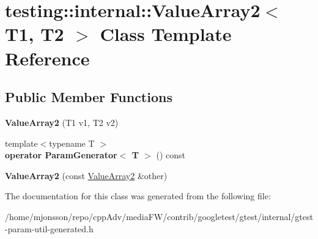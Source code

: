 \hypertarget{classtesting_1_1internal_1_1ValueArray2}{}\section{testing\+:\+:internal\+:\+:Value\+Array2$<$ T1, T2 $>$ Class Template Reference}
\label{classtesting_1_1internal_1_1ValueArray2}
\subsection*{Public Member Functions}
\begin{DoxyCompactItemize}
\item 
\mbox{\label{classtesting_1_1internal_1_1ValueArray2_af641714b9a06929e4dcabe8854d0da1c}} 
{\bfseries Value\+Array2} (T1 v1, T2 v2)
\item 
\mbox{\label{classtesting_1_1internal_1_1ValueArray2_aa81899f10bfd345c17aae540acc296a9}} 
{\footnotesize template$<$typename T $>$ }\\{\bfseries operator Param\+Generator$<$ T $>$} () const
\item 
\mbox{\label{classtesting_1_1internal_1_1ValueArray2_ac0da580bf4f38494da741c7140a7927d}} 
{\bfseries Value\+Array2} (const \hyperlink{classtesting_1_1internal_1_1ValueArray2}{Value\+Array2} \&other)
\end{DoxyCompactItemize}


The documentation for this class was generated from the following file\+:\begin{DoxyCompactItemize}
\item 
/home/mjonsson/repo/cpp\+Adv/media\+F\+W/contrib/googletest/gtest/internal/gtest-\/param-\/util-\/generated.\+h\end{DoxyCompactItemize}
